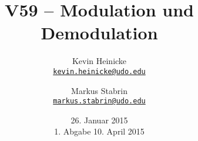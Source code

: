


\title{%
    V59 -- Modulation und Demodulation
}
\author{%
    Kevin Heinicke\\
    \texttt{\href{mailto:kevin.heinicke@udo.edu}{kevin.heinicke@udo.edu}}
    \and
    Markus Stabrin\\
    \texttt{\href{mailto:markus.stabrin@udo.edu}{markus.stabrin@udo.edu}}
}
\date{%
    26. Januar 2015\\
    {\small 1. Abgabe} 10. April 2015
}

    \maketitle%
    \tableofcontents
    \newpage
    
    
    

    \printbibliography

